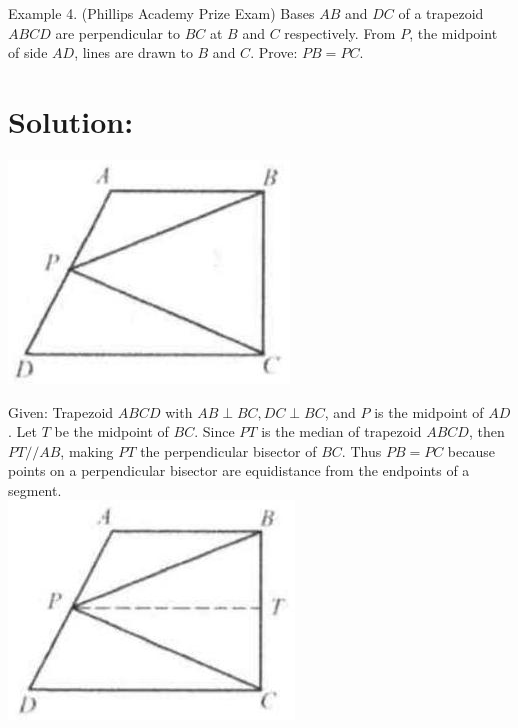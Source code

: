 \documentclass[10pt]{article}
\begin{document}
Example 4. (Phillips Academy Prize Exam) Bases \(A B\) and \(D C\) of a trapezoid \(A B C D\) are perpendicular to \(B C\) at \(B\) and \(C\) respectively. From \(P\), the midpoint of side \(A D\), lines are drawn to \(B\) and \(C\). Prove: \(P B=P C\).

\section*{Solution:}
\begin{center}
\includegraphics[max width=\textwidth]{2025_04_17_97bc1f7e44d93c271a88g-037(2)}
\end{center}

Given: Trapezoid \(A B C D\) with \(A B \perp B C, D C \perp B C\), and \(P\) is the midpoint of \(A D\). Let \(T\) be the midpoint of \(B C\). Since \(P T\) is the median of trapezoid \(A B C D\), then \(P T / / A B\), making \(P T\) the perpendicular bisector of \(B C\). Thus \(P B=P C\) because points on a perpendicular bisector are equidistance from the endpoints of a segment.\\
\includegraphics[max width=\textwidth, center]{2025_04_17_97bc1f7e44d93c271a88g-037(1)}
\end{document}
